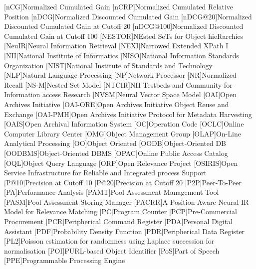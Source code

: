 [nCG]{Normalized Cumulated Gain}
[nCRP]{Normalized Cumulated Relative Position}
[nDCG]{Normalized Discounted Cumulated Gain}
[nDCG@20]{Normalized Discounted Cumulated Gain at Cutoff 20}
[nDCG@100]{Normalized Discounted Cumulated Gain at Cutoff 100}
[NESTOR]{NEsted SeTs for Object hieRarchies}
[NeuIR]{Neural Information Retrieval}
[NEXI]{Narrowed Extended XPath I}
[NII]{National Institute of Informatics}
[NISO]{National Information Standards Organization}
[NIST]{National Institute of Standards and Technology}
[NLP]{Natural Language Processing}
[NP]{Network Processor}
[NR]{Normalized Recall}
[NS-M]{Nested Set Model}
[NTCIR]{NII Testbeds and Community for Information access Research}
[NVSM]{Neural Vector Space Model}
[OAI]{Open Archives Initiative}
[OAI-ORE]{Open Archives Initiative Object Reuse and Exchange}
[OAI-PMH]{Open Archives Initiative Protocol for Metadata Harvesting}
[OAIS]{Open Archival Information System}
[OC]{Operation Code}
[OCLC]{Online Computer Library Center}
[OMG]{Object Management Group}
[OLAP]{On-Line Analytical Processing}
[OO]{Object Oriented}
[OODB]{Object-Oriented \acs{DB}}
[OODBMS]{Object-Oriented \acs{DBMS}}
[OPAC]{Online Public Access Catalog}
[OQL]{Object Query Language}
[ORP]{Open Relevance Project}
[OSIRIS]{Open Service Infrastructure for Reliable and Integrated process Support}
[P@10]{Precision at Cutoff 10}
[P@20]{Precision at Cutoff 20}
[P2P]{Peer-To-Peer}
[PA]{Performance Analysis}
[PAMT]{Pool-Assessment Management Tool}
[PASM]{Pool-Assessment Storing Manager}
[PACRR]{A Position-Aware Neural IR Model for Relevance Matching}
[PC]{Program Counter}
[PCP]{Pre-Commercial Procurement}
[PCR]{Peripherical Command Register}
[PDA]{Personal Digital Assistant}
[PDF]{Probability Density Function}
[PDR]{Peripherical Data Register}
[PL2]{Poisson estimation for randomness using Laplace succession for normalisation}
[POI]{\acs{PURL}-based Object Identifier}
[PoS]{Part of Speech}
[PPE]{Programmable Processing Engine}
